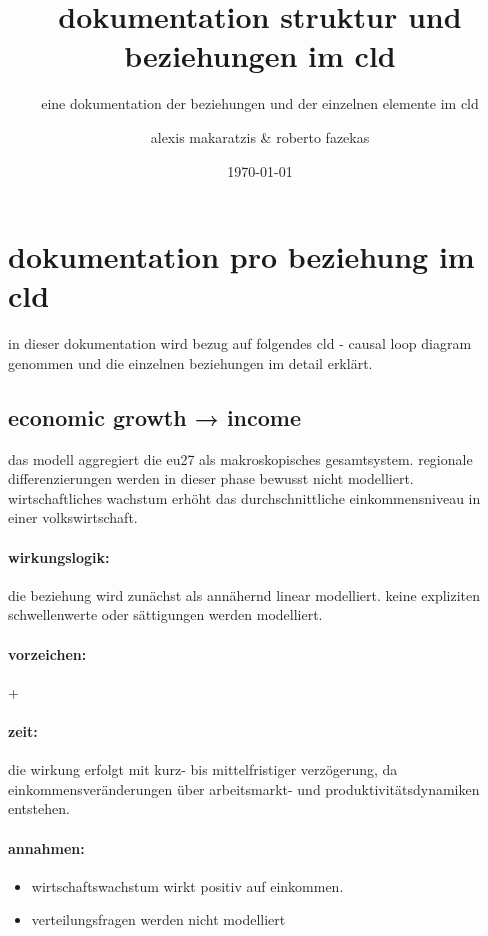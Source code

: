 \documentclass[11pt, a4paper, oneside]{scrartcl}
\title{dokumentation struktur und beziehungen im cld}
\subtitle{eine dokumentation der beziehungen und der einzelnen elemente im cld}
\author{alexis makaratzis & roberto fazekas}
\date{\today}
\begin{document}
\maketitle
\newpage

\section{dokumentation pro beziehung im cld}

in dieser dokumentation wird bezug auf folgendes cld - causal loop diagram genommen und die einzelnen beziehungen im detail erklärt.

\subsection{economic growth → income}
das modell aggregiert die eu27 als makroskopisches gesamtsystem. regionale differenzierungen werden in dieser phase bewusst nicht modelliert.
wirtschaftliches wachstum erhöht das durchschnittliche einkommensniveau in einer volkswirtschaft. 

\paragraph{wirkungslogik:}

die beziehung wird zunächst als annähernd linear modelliert. keine expliziten schwellenwerte oder sättigungen werden modelliert.

\paragraph{vorzeichen:}

+

\paragraph{zeit:} 

die wirkung erfolgt mit kurz- bis mittelfristiger verzögerung, da einkommensveränderungen über arbeitsmarkt- und produktivitätsdynamiken entstehen.

\paragraph{annahmen:}
\begin{itemize}
\item wirtschaftswachstum wirkt positiv auf einkommen. 
\item verteilungsfragen werden nicht modelliert
\end{itemize}
\end{document}

